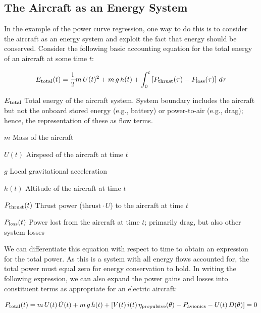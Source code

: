 \documentclass[conf]{new-aiaa}
\begin{document}
    \subsection{The Aircraft as an Energy System}

    In the example of the power curve regression, one way to do this is to consider the aircraft as an energy system and exploit the fact that energy should be conserved. Consider the following basic accounting equation for the total energy of an aircraft at some time $t$:

    \begin{equation}
        E_{\rm total}(t) =
        \frac{1}{2}m \, U(t)^2
        + m \, g \, h(t)
        + \int_0^t \left[ P_{\rm thrust}(\tau)
        - P_{\rm loss}(\tau)
        \right] \, d\tau
        \label{eq:total_energy}
    \end{equation}

    \begin{eqexpl}
        \item{$E_{\rm total}$} Total energy of the aircraft system. System boundary includes the aircraft but not the onboard stored energy (e.g., battery) or power-to-air (e.g., drag); hence, the representation of these as flow terms.
        \item{$m$} Mass of the aircraft
        \item{$U(t)$} Airspeed of the aircraft at time $t$
        \item{$g$} Local gravitational acceleration
        \item{$h(t)$} Altitude of the aircraft at time $t$
        \item{$P_{\rm thrust}(t)$} Thrust power ($\text{thrust} \cdot U$) to the aircraft at time $t$
        \item{$P_{\rm loss}(t)$} Power lost from the aircraft at time $t$; primarily drag, but also other system losses
    \end{eqexpl}

    \noindent We can differentiate this equation with respect to time to obtain an expression for the total power. As this is a system with all energy flows accounted for, the total power must equal zero for energy conservation to hold. In writing the following expression, we can also expand the power gains and losses into constituent terms as appropriate for an electric aircraft:

    \begin{equation}
        P_{\rm total}(t) =
        m \, U(t) \, \dot{U}(t)
        + m \, g \, \dot{h}(t)
        + \left[
        V(t) \, i(t) \, \eta_{\rm propulsive}(\theta)
        - P_{\rm avionics}
        - U(t) \, D(\theta)
        \right] = 0
        \label{eq:total_power}
    \end{equation}
\end{document}
